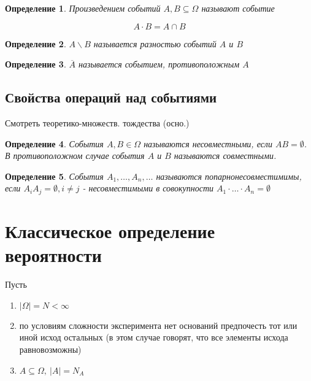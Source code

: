 \documentclass[a4paper, 14pt]{report}
\newtheorem{defenition}{Определение}[chapter]
\begin{document}
    \begin{defenition}
        Произведением событий $A,B \subseteq \Omega$ называют событие

        $$
        A \cdot B = A \cap B
        $$
    \end{defenition}

    \begin{defenition}
        $A \backslash B$ называется разностью событий $A$ и $B$
    \end{defenition}

    \begin{defenition}
        $\overline{A}$ называется событием, противоположным $A$
    \end{defenition}

    \subsection{Свойства операций над событиями}

    Смотреть теоретико-множеств. тождества (осно.)

    \begin{defenition}
        События $A,B \in \Omega$ называются несовместными, если $AB = \emptyset$. В противоположном случае события $A$ и $B$ называются совместными.
    \end{defenition}

    \begin{defenition}
        События $A_1, \dots, A_n, \dots$ называются попарнонесовместимимы, если $A_i A_j = \emptyset, i \ne j$ - несовместимыми в совокупности $A_1 \cdot \dots \cdot A_n = \emptyset$
    \end{defenition}

    \section{Классическое определение вероятности}

    Пусть

    \begin{enumerate}
        \item $|\Omega| = N < \infty$
        \item по условиям сложности эксперимента нет оснований предпочесть тот или иной исход остальных (в этом случае говорят, что все элементы исхода равновозможны)
        \item $A \subseteq \Omega,\ |A| = N_A$
    \end{enumerate}
\end{document}
